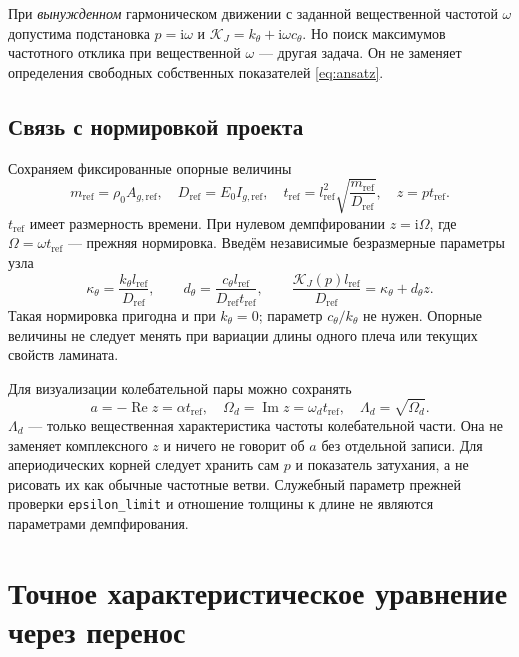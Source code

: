 \documentclass[11pt,a4paper]{article}
\numberwithin{equation}{section}
\newcommand{\ii}{\mathrm i}
\newcommand{\kth}{k_\theta}
\newcommand{\cth}{c_\theta}
\newcommand{\KJ}{\mathcal K_J}
\newcommand{\refsub}{\mathrm{ref}}
\newcommand{\tref}{t_{\refsub}}
\newcommand{\lref}{l_{\refsub}}
\newcommand{\Dref}{D_{\refsub}}
\newcommand{\mref}{m_{\refsub}}
\begin{document}
При \emph{вынужденном} гармоническом движении с заданной вещественной
частотой $\omega$ допустима подстановка $p=\ii\omega$ и
$\KJ=\kth+\ii\omega\cth$. Но поиск максимумов частотного отклика
при вещественной $\omega$ --- другая задача. Он не заменяет определения
свободных собственных показателей \eqref{eq:ansatz}.

\subsection{Связь с нормировкой проекта}

Сохраняем фиксированные опорные величины
\begin{equation}
 \mref=\rho_0 A_{g,\refsub},\quad
 \Dref=E_0 I_{g,\refsub},\quad
 \tref=\lref^2\sqrt{\frac{\mref}{\Dref}},\quad
 z=p\tref.
 \label{eq:scales}
\end{equation}
$\tref$ имеет размерность времени. При нулевом демпфировании
$z=\ii\Omega$, где $\Omega=\omega\tref$ --- прежняя нормировка.
Введём независимые безразмерные параметры узла
\begin{equation}
 \boxed{\kappa_\theta=\frac{\kth\lref}{\Dref},\qquad
 d_\theta=\frac{\cth\lref}{\Dref\tref},\qquad
 \frac{\KJ(p)\lref}{\Dref}=\kappa_\theta+d_\theta z.}
 \label{eq:dimensionlessjoint}
\end{equation}
Такая нормировка пригодна и при $\kth=0$; параметр $\cth/\kth$
не нужен. Опорные величины не следует менять при вариации длины одного
плеча или текущих свойств ламината.

Для визуализации колебательной пары можно сохранять
\begin{equation}
 a=-\operatorname{Re}z=\alpha\tref,\quad
 \Omega_d=\operatorname{Im}z=\omega_d\tref,\quad
 \Lambda_d=\sqrt{\Omega_d}.
 \label{eq:lambdad}
\end{equation}
$\Lambda_d$ --- только вещественная характеристика частоты колебательной
части. Она не заменяет комплексного $z$ и ничего не говорит об $a$ без
отдельной записи. Для апериодических корней следует хранить сам $p$ и
показатель затухания, а не рисовать их как обычные частотные ветви.
Служебный параметр прежней проверки \texttt{epsilon\_limit} и отношение
толщины к длине не являются параметрами демпфирования.

\section{Точное характеристическое уравнение через перенос}
\label{sec:transfer}
\end{document}
